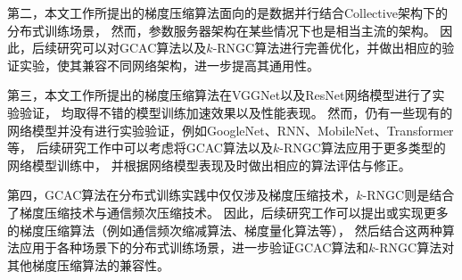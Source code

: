 \documentclass{xdupgthesis}
\begin{document}
第二，本文工作所提出的梯度压缩算法面向的是数据并行结合Collective架构下的分布式训练场景，
然而，参数服务器架构在某些情况下也是相当主流的架构。
因此，后续研究可以对GCAC算法以及$k$-RNGC算法进行完善优化，并做出相应的验证实验，使其兼容不同网络架构，进一步提高其通用性。

第三，本文工作所提出的梯度压缩算法在VGGNet以及ResNet网络模型进行了实验验证，
均取得不错的模型训练加速效果以及性能表现。
然而，仍有一些现有的网络模型并没有进行实验验证，例如GoogleNet、RNN、MobileNet、Transformer等，
后续研究工作中可以考虑将GCAC算法以及$k$-RNGC算法应用于更多类型的网络模型训练中，
并根据网络模型表现及时做出相应的算法评估与修正。

第四，GCAC算法在分布式训练实践中仅仅涉及梯度压缩技术，$k$-RNGC则是结合了梯度压缩技术与通信频次压缩技术。
因此，后续研究工作可以提出或实现更多的梯度压缩算法（例如通信频次缩减算法、梯度量化算法等），
然后结合这两种算法应用于各种场景下的分布式训练场景，进一步验证GCAC算法和$k$-RNGC算法对其他梯度压缩算法的兼容性。
\end{document}
